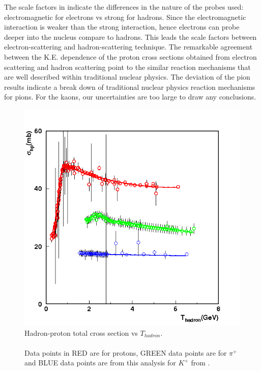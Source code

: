 The scale factors in  indicate the differences in the nature of the probes used: electromagnetic for electrons vs strong for hadrons. Since the electromagnetic interaction is weaker than the strong interaction, hence electrons can probe deeper into the nucleus compare to hadrons. This leads the scale factors between electron-scattering and hadron-scattering technique. The remarkable agreement between the K.E. dependence of the proton cross sections obtained from electron scattering and hadron scattering point to the similar reaction mechanisms that are well described within traditional nuclear physics. The deviation of the pion results indicate a break down of traditional nuclear physics reaction mechanisms for pions. For the kaons, our uncertainties are too large to draw any conclusions.

\begin{figure}[!tbp]
  \centering
  \includegraphics[width=0.8\columnwidth]{crr1}
  \caption[Hadron-proton total cross section vs $T_{hadron}$.]{\label{fig:crr1}Hadron-proton total cross section vs $T_{hadron}$.\\\\ Data points in RED are for protons, GREEN data points are for $\pi^+$ and BLUE data points are from this analysis for $K^+$ from \cite{hinton01}.}
\end{figure}


